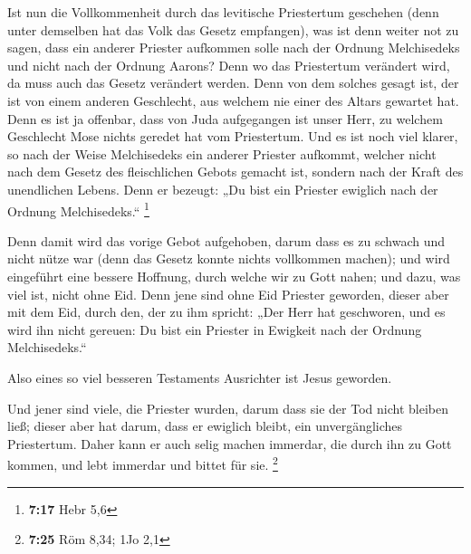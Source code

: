  Ist nun die Vollkommenheit durch das levitische
Priestertum geschehen (denn unter demselben hat das Volk das Gesetz
empfangen), was ist denn weiter not zu sagen, dass ein anderer Priester
aufkommen solle nach der Ordnung Melchisedeks und nicht nach der Ordnung
Aarons?  Denn wo das Priestertum verändert wird, da muss
auch das Gesetz verändert werden.  Denn von dem solches
gesagt ist, der ist von einem anderen Geschlecht, aus welchem nie einer
des Altars gewartet hat.  Denn es ist ja offenbar, dass von
Juda aufgegangen ist unser Herr, zu welchem Geschlecht Mose nichts
geredet hat vom Priestertum.  Und es ist noch viel klarer,
so nach der Weise Melchisedeks ein anderer Priester aufkommt,
 welcher nicht nach dem Gesetz des fleischlichen Gebots
gemacht ist, sondern nach der Kraft des unendlichen Lebens.
 Denn er bezeugt: „Du bist ein Priester ewiglich nach der
Ordnung Melchisedeks.`` \footnote{\textbf{7:17} Hebr 5,6}

 Denn damit wird das vorige Gebot aufgehoben, darum dass es
zu schwach und nicht nütze war  (denn das Gesetz konnte
nichts vollkommen machen); und wird eingeführt eine bessere Hoffnung,
durch welche wir zu Gott nahen;  und dazu, was viel ist,
nicht ohne Eid. Denn jene sind ohne Eid Priester geworden, 
dieser aber mit dem Eid, durch den, der zu ihm spricht: „Der Herr hat
geschworen, und es wird ihn nicht gereuen: Du bist ein Priester in
Ewigkeit nach der Ordnung Melchisedeks.``

 Also eines so viel besseren Testaments Ausrichter ist
Jesus geworden.

 Und jener sind viele, die Priester wurden, darum dass sie
der Tod nicht bleiben ließ;  dieser aber hat darum, dass er
ewiglich bleibt, ein unvergängliches Priestertum.  Daher
kann er auch selig machen immerdar, die durch ihn zu Gott kommen, und
lebt immerdar und bittet für sie. \footnote{\textbf{7:25} Röm 8,34; 1Jo
  2,1}

